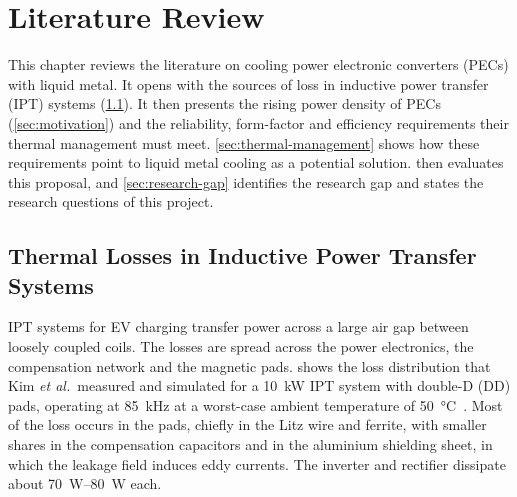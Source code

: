 \chapter{Literature Review}
\label{ch:literature}

This chapter reviews the literature on cooling power electronic converters
(PECs) with liquid metal. It opens with the sources of loss in inductive power
transfer (IPT) systems (\cref{sec:ipt-losses}). It then presents the rising power density of PECs
(\cref{sec:motivation}) and the reliability, form-factor and efficiency
requirements their thermal management must meet. \cref{sec:thermal-management} shows how these
requirements point to liquid metal cooling as a potential solution.  then evaluates this
proposal, and \cref{sec:research-gap} identifies the research gap and states
the research questions of this project.

\section{Thermal Losses in Inductive Power Transfer Systems}
\label{sec:ipt-losses}

IPT systems for EV charging transfer power across a large air gap between loosely coupled
coils. The losses are spread across the power electronics, the
compensation network and the magnetic pads.  shows the
loss distribution that Kim \emph{et al.}\ measured and simulated for a
\SI{10}{\kilo\watt} IPT system with double-D (DD) pads, operating at
\SI{85}{\kilo\hertz} at a worst-case ambient temperature of
\SI{50}{\celsius}~\cite{kim_thermal_2022}. Most of the loss occurs in the pads,
chiefly in the Litz wire and ferrite, with smaller shares in the compensation
capacitors and in the aluminium shielding sheet, in which the leakage field
induces eddy currents. The inverter and rectifier dissipate about
\SIrange{70}{80}{\watt} each.

